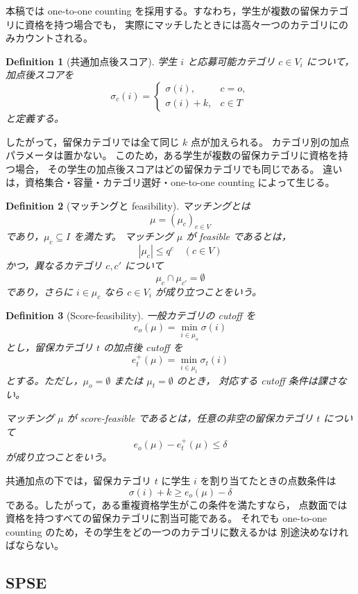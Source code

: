 \documentclass[
  12pt,
  a4paper,
  oneside,
  onecolumn,
  titlepage,
  final
]{jsarticle}
\newtheorem{definition}{Definition}
\newcommand{\1}{\mathbf{1}}
\begin{document}
本稿では one-to-one counting を採用する。すなわち，学生が複数の留保カテゴリに資格を持つ場合でも，
実際にマッチしたときには高々一つのカテゴリにのみカウントされる。

\begin{definition}[共通加点後スコア]
学生 $i$ と応募可能カテゴリ $c\in V_i$ について，加点後スコアを
\[
    \sigma_c(i)=
    \begin{cases}
        \sigma(i), & c=o,\\[3pt]
        \sigma(i)+k, & c\in T
    \end{cases}
\]
と定義する。
\end{definition}

したがって，留保カテゴリでは全て同じ $k$ 点が加えられる。
カテゴリ別の加点パラメータは置かない。
このため，ある学生が複数の留保カテゴリに資格を持つ場合，
その学生の加点後スコアはどの留保カテゴリでも同じである。
違いは，資格集合・容量・カテゴリ選好・one-to-one counting によって生じる。

\begin{definition}[マッチングと feasibility]
マッチングとは
\[
    \mu=(\mu_c)_{c\in V}
\]
であり，$\mu_c\subseteq I$ を満たす。
マッチング $\mu$ が feasible であるとは，
\[
    |\mu_c|\le q^c\quad(c\in V)
\]
かつ，異なるカテゴリ $c,c'$ について
\[
    \mu_c\cap\mu_{c'}=\emptyset
\]
であり，さらに $i\in\mu_c$ なら $c\in V_i$ が成り立つことをいう。
\end{definition}

\begin{definition}[Score-feasibility]
一般カテゴリの cutoff を
\[
    e_o(\mu)=\min_{i\in\mu_o}\sigma(i)
\]
とし，留保カテゴリ $t$ の加点後 cutoff を
\[
    e_t^+(\mu)=\min_{i\in\mu_t}\sigma_t(i)
\]
とする。ただし，$\mu_o=\emptyset$ または $\mu_t=\emptyset$ のとき，
対応する cutoff 条件は課さない。

マッチング $\mu$ が score-feasible であるとは，任意の非空の留保カテゴリ $t$ について
\[
    e_o(\mu)-e_t^+(\mu)\le \delta
\]
が成り立つことをいう。
\end{definition}

共通加点の下では，留保カテゴリ $t$ に学生 $i$ を割り当てたときの点数条件は
\[
    \sigma(i)+k\ge e_o(\mu)-\delta
\]
である。したがって，ある重複資格学生がこの条件を満たすなら，
点数面では資格を持つすべての留保カテゴリに割当可能である。
それでも one-to-one counting のため，その学生をどの一つのカテゴリに数えるかは
別途決めなければならない。

\subsection{SPSE}
\end{document}
